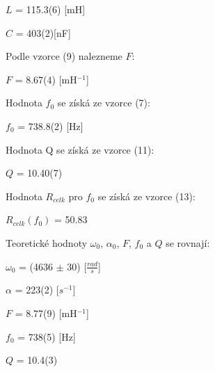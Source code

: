\documentclass[a4paper,11pt]{article}
\begin{document}
\begin{minipage}[t]{0.5\textwidth}
\begin{center}
                    $L$ = 115.3(6) [mH]
                    \vspace{5pt}
                    \par $C$ = 403(2)[nF]
                \end{center}
                Podle vzorce (9) nalezneme $F$:
                \begin{center}
                    $F$ = 8.67(4) [mH$^{-1}$]
                \end{center}
                Hodnota $f_0$ se získá ze vzorce (7): 
                \begin{center}
                    $f_0$ = 738.8(2) [Hz]
                \end{center}
                Hodnota Q se získá ze vzorce (11): 
                \begin{center}
                    $Q$ = 10.40(7)
                \end{center}
                Hodnota $R_{celk}$ pro $f_0$ se získá ze vzorce (13): 
                \begin{center}
                    $R_{celk}(f_0)$ = 50.83
                \end{center}
                Teoretické hodnoty $\omega_0$, $\alpha_0$, $F$, $f_0$ a $Q$ se rovnají:
                \begin{center}
                    $\omega_0$ = (4636 $\pm$ 30) [$\frac{rad}{s}$]
                    \vspace{5pt}
                    \par $\alpha$ = 223(2) [$s^{-1}$]
                    \vspace{5pt}
                    \par $F$ = 8.77(9) [mH$^{-1}$]
                    \vspace{5pt}
                    \par $f_0$ = 738(5) [Hz]
                    \vspace{5pt}
                    \par $Q$ = 10.4(3)
                    \vspace{5pt}
                \end{center}
\end{minipage}
\hspace{10pt}
\end{document}
